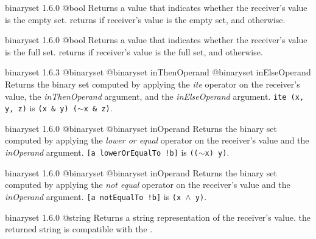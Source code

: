 {binaryset}
{1.6.0}
{@bool}
{Returns a  value that indicates whether the receiver's value is the empty set.}
{returns  if receiver's value is the empty set, and  otherwise.}







{binaryset}
{1.6.0}
{@bool}
{Returns a  value that indicates whether the receiver's value is the full set.}
{returns  if receiver's value is the full set, and  otherwise.}







{binaryset}
{1.6.3}
{@binaryset}
{@binaryset inThenOperand}
{@binaryset inElseOperand}
{Returns the binary set computed by applying the \emph{ite} operator on the receiver's value, the \emph{inThenOperand} argument, and the  \emph{inElseOperand} argument.}
{\texttt{ite (x, y, z)} is \texttt{(x \& y) \textbar ($\sim$x \& z)}.}







{binaryset}
{1.6.0}
{@binaryset}
{@binaryset inOperand}
{Returns the binary set computed by applying the \emph{lower or equal} operator on the receiver's value and the \emph{inOperand} argument.}
{\texttt{[a lowerOrEqualTo !b]} is \texttt{(($\sim$x) \textbar y)}.}







{binaryset}
{1.6.0}
{@binaryset}
{@binaryset inOperand}
{Returns the binary set computed by applying the \emph{not equal} operator on the receiver's value and the \emph{inOperand} argument.}
{\texttt{[a notEqualTo !b]} is \texttt{(x $\wedge$ y)}.}







{binaryset}
{1.6.0}
{@string}
{Returns a string representation of the receiver's value.}
{the returned string is compatible with the .}







